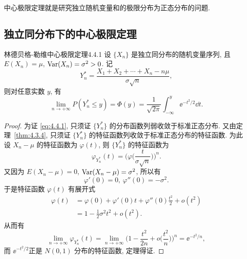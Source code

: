 中心极限定理就是研究独立随机变量和的极限分布为正态分布的问题.

\subsection{独立同分布下的中心极限定理}

\begin{theorem}{林德贝格-勒维中心极限定理}{4.4.1}
    设 $ \{ X_n \} $ 是独立同分布的随机变量序列, 且 $ E (X_n) = \mu $, $\operatorname{Var}  (X_n)= \sigma^2 > 0 $.
    记
    \begin{equation*}
        Y_n^* = \frac{X_1 + X_2 + \dotsb + X_n - n \mu}{\sigma \sqrt{n}},
    \end{equation*}
    则对任意实数 $ y $, 有
    \begin{equation}\label{eq:4.4.1}
        \lim_{n \to +\infty} P ( Y_n ^* \leq y ) = \Phi (y) = \frac{1}{\sqrt{2\pi}} \int_{-\infty}^y \ee^{-t^2/2} \dd t.
    \end{equation}
\end{theorem}

\begin{proof}
    为证 \eqref{eq:4.4.1}, 只须证 $ \{ Y_n^* \} $ 的分布函数列弱收敛于标准正态分布.
    又由定理~\ref{thm:4.3.4}, 只须证 $ \{ Y_n^* \} $ 的特征函数列收敛于标准正态分布的特征函数.
    为此设 $ X_n - \mu $ 的特征函数为 $ \varphi (t) $, 则 $ \{ Y_n^* \} $ 的特征函数为
    \begin{equation*}
        \varphi_{Y_n^*} (t) = \Biggl( \varphi \biggl( \frac{t}{\sigma \sqrt{n}} \biggr) \Biggr)^n.
    \end{equation*}
    又因为 $ E ( X_n - \mu ) = 0 $, $\operatorname{Var}  ( X_n - \mu ) = \sigma^2 $, 所以有
    \begin{equation*}
        \varphi' (0) = 0, \ \varphi'' (0) = - \sigma^2.
    \end{equation*}
    于是特征函数 $ \varphi (t) $ 有展开式
    \begin{align*}
        \varphi (t) & = \varphi (0) + \varphi' (0) t + \varphi'' (0) \frac{t^2}{2} + o (t^2)\\
        & = 1 - \frac{1}{2} \sigma^2 t^2 + o (t^2).
    \end{align*}
    从而有
    \begin{equation*}
        \lim_{n \to +\infty} \varphi_{Y_n^*} (t) = \lim_{n \to +\infty} \Biggl( 1 - \frac{t^2}{2n} + o \biggl( \frac{t^2}{n} \biggr) \Biggr)^n = \ee^{-t^2/n},
    \end{equation*}
    而 $ \ee^{-t^2/2} $正是 $ N (0,1) $ 分布的特征函数, 定理得证.
\end{proof}

